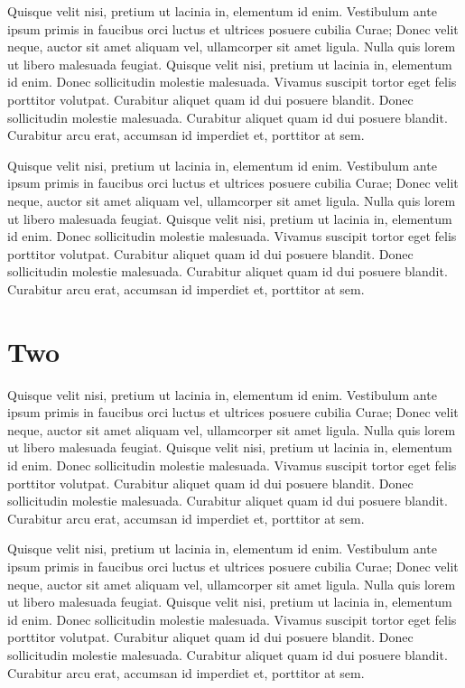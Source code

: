 \documentclass{scrbook}
\begin{document}
Quisque velit nisi, pretium ut lacinia in, elementum id enim. Vestibulum
ante ipsum primis in faucibus orci luctus et ultrices posuere cubilia
Curae; Donec velit neque, auctor sit amet aliquam vel, ullamcorper sit
amet ligula. Nulla quis lorem ut libero malesuada feugiat. Quisque velit
nisi, pretium ut lacinia in, elementum id enim. Donec sollicitudin
molestie malesuada. Vivamus suscipit tortor eget felis porttitor
volutpat. Curabitur aliquet quam id dui posuere blandit. Donec
sollicitudin molestie malesuada. Curabitur aliquet quam id dui posuere
blandit. Curabitur arcu erat, accumsan id imperdiet et, porttitor at
sem.

Quisque velit nisi, pretium ut lacinia in, elementum id enim. Vestibulum
ante ipsum primis in faucibus orci luctus et ultrices posuere cubilia
Curae; Donec velit neque, auctor sit amet aliquam vel, ullamcorper sit
amet ligula. Nulla quis lorem ut libero malesuada feugiat. Quisque velit
nisi, pretium ut lacinia in, elementum id enim. Donec sollicitudin
molestie malesuada. Vivamus suscipit tortor eget felis porttitor
volutpat. Curabitur aliquet quam id dui posuere blandit. Donec
sollicitudin molestie malesuada. Curabitur aliquet quam id dui posuere
blandit. Curabitur arcu erat, accumsan id imperdiet et, porttitor at
sem.

\section{Two}\label{c2-c2-two}

Quisque velit nisi, pretium ut lacinia in, elementum id enim. Vestibulum
ante ipsum primis in faucibus orci luctus et ultrices posuere cubilia
Curae; Donec velit neque, auctor sit amet aliquam vel, ullamcorper sit
amet ligula. Nulla quis lorem ut libero malesuada feugiat. Quisque velit
nisi, pretium ut lacinia in, elementum id enim. Donec sollicitudin
molestie malesuada. Vivamus suscipit tortor eget felis porttitor
volutpat. Curabitur aliquet quam id dui posuere blandit. Donec
sollicitudin molestie malesuada. Curabitur aliquet quam id dui posuere
blandit. Curabitur arcu erat, accumsan id imperdiet et, porttitor at
sem.

Quisque velit nisi, pretium ut lacinia in, elementum id enim. Vestibulum
ante ipsum primis in faucibus orci luctus et ultrices posuere cubilia
Curae; Donec velit neque, auctor sit amet aliquam vel, ullamcorper sit
amet ligula. Nulla quis lorem ut libero malesuada feugiat. Quisque velit
nisi, pretium ut lacinia in, elementum id enim. Donec sollicitudin
molestie malesuada. Vivamus suscipit tortor eget felis porttitor
volutpat. Curabitur aliquet quam id dui posuere blandit. Donec
sollicitudin molestie malesuada. Curabitur aliquet quam id dui posuere
blandit. Curabitur arcu erat, accumsan id imperdiet et, porttitor at
sem.
\end{document}
